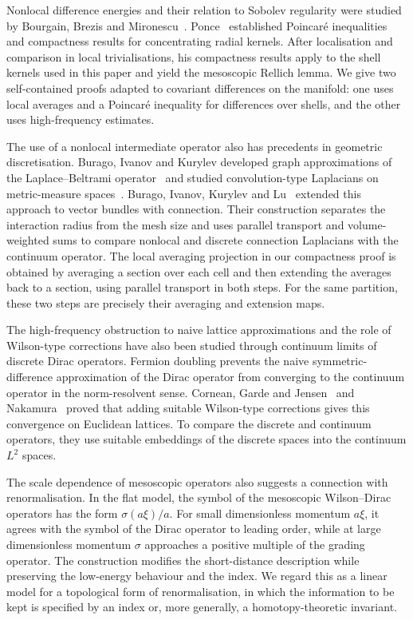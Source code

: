 \documentclass[a4paper,oneside,12pt]{amsart}
\theoremstyle{plain}
\theoremstyle{definition}
\theoremstyle{remark}
\begin{document}
Nonlocal difference energies and their relation to Sobolev regularity were studied by Bourgain, Brezis and Mironescu~\cite{MR3586796}.
Ponce~\cite{MR2041005} established Poincar\'e inequalities and compactness results for concentrating radial kernels.
After localisation and comparison in local trivialisations, his compactness results apply to the shell kernels used in this paper and yield the mesoscopic Rellich lemma.
We give two self-contained proofs adapted to covariant differences on the manifold: one uses local averages and a Poincar\'e inequality for differences over shells, and the other uses high-frequency estimates.

The use of a nonlocal intermediate operator also has precedents in geometric discretisation.
Burago, Ivanov and Kurylev developed graph approximations of the Laplace--Beltrami operator~\cite{MR3299811} and studied convolution-type Laplacians on metric-measure spaces~\cite{MR3990939}.
Burago, Ivanov, Kurylev and Lu~\cite{MR4437353} extended this approach to vector bundles with connection.
Their construction separates the interaction radius from the mesh size and uses parallel transport and volume-weighted sums to compare nonlocal and discrete connection Laplacians with the continuum operator.
The local averaging projection in our compactness proof is obtained by averaging a section over each cell and then extending the averages back to a section, using parallel transport in both steps.
For the same partition, these two steps are precisely their averaging and extension maps.

The high-frequency obstruction to naive lattice approximations and the role of Wilson-type corrections have also been studied through continuum limits of discrete Dirac operators.
Fermion doubling prevents the naive symmetric-difference approximation of the Dirac operator from converging to the continuum operator in the norm-resolvent sense.
Cornean, Garde and Jensen~\cite{MR4590014} and Nakamura~\cite{MR4741062} proved that adding suitable Wilson-type corrections gives this convergence on Euclidean lattices.
To compare the discrete and continuum operators, they use suitable embeddings of the discrete spaces into the continuum $L^2$ spaces.

The scale dependence of mesoscopic operators also suggests a connection with renormalisation.
In the flat model, the symbol of the mesoscopic Wilson--Dirac operators has the form $\sigma(a\xi)/a$.
For small dimensionless momentum $a\xi$, it agrees with the symbol of the Dirac operator to leading order, while at large dimensionless momentum $\sigma$ approaches a positive multiple of the grading operator.
The construction modifies the short-distance description while preserving the low-energy behaviour and the index.
We regard this as a linear model for a topological form of renormalisation, in which the information to be kept is specified by an index or, more generally, a homotopy-theoretic invariant.
\end{document}
